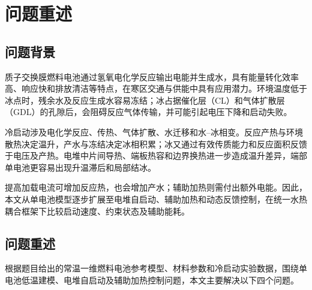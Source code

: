 \documentclass[bwprint]{gmcmthesis}
\numberwithin{equation}{section}
\numberwithin{figure}{section}
\begin{document}
\section{问题重述}
\subsection{问题背景}
质子交换膜燃料电池通过氢氧电化学反应输出电能并生成水，具有能量转化效率高、响应快和排放清洁等特点，在寒区交通与供能中具有应用潜力\cite{huang2021review}。环境温度低于冰点时，残余水及反应生成水容易冻结；冰占据催化层（CL）和气体扩散层（GDL）的孔隙后，会阻碍反应气体传输，并可能引起电压下降和启动失败\cite{luo2018review}。

冷启动涉及电化学反应、传热、气体扩散、水迁移和水--冰相变。反应产热与环境散热决定温升，产水与冻结决定冰相积累；冰又通过有效传质能力和反应面积反馈于电压及产热。电堆中片间导热、端板热容和边界换热进一步造成温升差异，端部单电池更容易出现升温滞后和局部结冰\cite{ma2026endplate}。

提高加载电流可增加反应热，也会增加产水\cite{min2022current}；辅助加热则需付出额外电能。因此，本文从单电池模型逐步扩展至电堆自启动、辅助加热和动态反馈控制，在统一水热耦合框架下比较启动速度、约束状态及辅助能耗。

\subsection{问题重述}
根据题目给出的常温一维燃料电池参考模型、材料参数和冷启动实验数据，围绕单电池低温建模、电堆自启动及辅助加热控制问题，本文主要解决以下四个问题。
\end{document}
